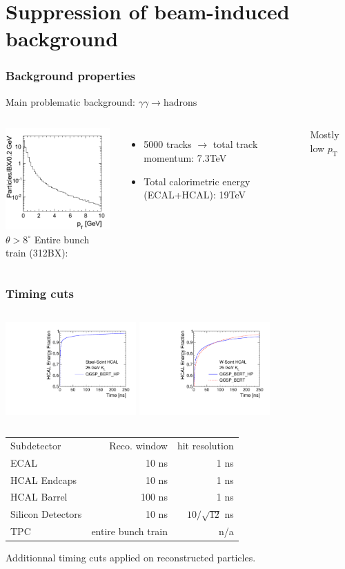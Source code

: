 \documentclass{beamer}
\begin{document}
\section[Bkg treatment]{Suppression of beam-induced background}
\begin{frame}
\frametitle{Background properties}
Main problematic background: $\gamma\gamma\to\textrm{hadrons}$
\begin{columns}[c]
\column{6cm}
\centering
\includegraphics[width=4cm]{../SIDWorkshop/ggPT}\\
$\theta>8^\circ$
\column{6cm}
Entire bunch train (312BX):
\begin{itemize}
  \item 5000 tracks $\to$ total track momentum: \alert{7.3TeV}
  \item Total calorimetric energy (ECAL+HCAL): \alert{19TeV}
\end{itemize}
Mostly low $p_{\textrm{T}}$
\end{columns}
\end{frame}
\begin{frame}
\frametitle{Timing cuts}
\begin{columns}[c]
\column{5cm}
\centering
\includegraphics[width=5cm]{../SIDWorkshop/hcalTimingSteel.pdf}
\column{5cm}
\centering
\includegraphics[width=5cm]{../SIDWorkshop/hcalTimingTungsten.pdf}
\end{columns}
\begin{center}
\begin{tabular}{lrr}
Subdetector &Reco. window &hit resolution\\
ECAL &10 ns &1 ns\\
HCAL Endcaps &10 ns &1 ns\\
HCAL Barrel &100 ns &1 ns\\
Silicon Detectors &10 ns &$10/\sqrt{12}$ ns\\
TPC & entire bunch train & n/a
\end{tabular}
\end{center}
Additionnal timing cuts applied on reconstructed particles.
\end{frame}
\end{document}
